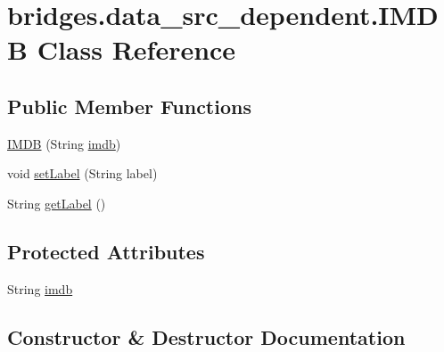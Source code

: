 \hypertarget{classbridges_1_1data__src__dependent_1_1_i_m_d_b}{}\section{bridges.\+data\+\_\+src\+\_\+dependent.\+I\+M\+DB Class Reference}
\label{classbridges_1_1data__src__dependent_1_1_i_m_d_b}
\subsection*{Public Member Functions}
\begin{DoxyCompactItemize}
\item 
\hyperlink{classbridges_1_1data__src__dependent_1_1_i_m_d_b_aff9987e893b16275182bc81b7e64b048}{I\+M\+DB} (String \hyperlink{classbridges_1_1data__src__dependent_1_1_i_m_d_b_a2913407abe6019a396d4a2ac086283df}{imdb})
\item 
void \hyperlink{classbridges_1_1data__src__dependent_1_1_i_m_d_b_a9022297c43873b9df0ad6d3c91977bd8}{set\+Label} (String label)
\item 
String \hyperlink{classbridges_1_1data__src__dependent_1_1_i_m_d_b_ad2d0e1edabdb0596a3308c160f63cb2b}{get\+Label} ()
\end{DoxyCompactItemize}
\subsection*{Protected Attributes}
\begin{DoxyCompactItemize}
\item 
String \hyperlink{classbridges_1_1data__src__dependent_1_1_i_m_d_b_a2913407abe6019a396d4a2ac086283df}{imdb}
\end{DoxyCompactItemize}


\subsection{Constructor \& Destructor Documentation}
\mbox{\label{classbridges_1_1data__src__dependent_1_1_i_m_d_b_aff9987e893b16275182bc81b7e64b048}} 
